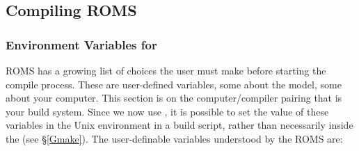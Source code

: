 \subsection{Compiling ROMS}
\label{Build}

\subsubsection{Environment Variables for }
\label{make_var}

ROMS has a growing list of choices the user must make before starting
the compile process. These are user-defined variables, some about
the model, some about your computer. This section is on the
computer/compiler pairing that is your build system. Since we now
use , it is possible to set the value of these
variables in the Unix environment in a build script, rather than
necessarily inside the  (see \S\ref{Gmake}).  The
user-definable variables understood by the ROMS  are:
